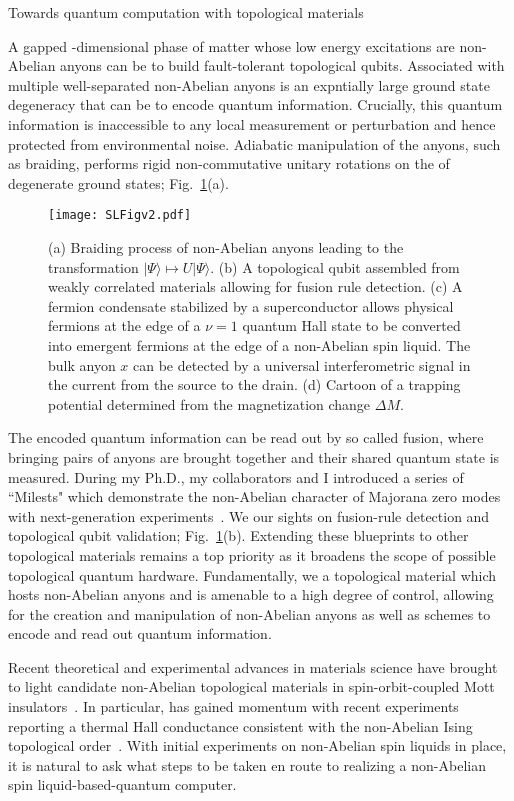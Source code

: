 {Towards quantum computation with topological materials}

A gapped -dimensional phase of matter whose low energy excitations are non-Abelian anyons can be  to build fault-tolerant topological qubits. Associated with multiple well-separated non-Abelian anyons is an expntially large ground state degeneracy that can be  to encode quantum information. Crucially, this quantum information is inaccessible to any local measurement or perturbation and hence protected from environmental noise. Adiabatic manipulation of the anyons, such as braiding, performs rigid non-commutative unitary rotations on the  of degenerate ground states;  Fig.~\ref{SLfig}(a).
\begin{figure}[htbp]
   \centering
   \texttt{[image: SLFigv2.pdf]}
   \caption{(a) Braiding process of  non-Abelian anyons leading to the transformation $|\Psi \rangle \mapsto U | \Psi \rangle$. 
{   (b) A topological qubit assembled from weakly correlated materials allowing for fusion rule detection.}
   (c) A fermion condensate stabilized by a superconductor allows physical fermions at the edge of a $\nu=1$ quantum Hall state to be converted into emergent fermions at the edge of a non-Abelian spin liquid.
{   The bulk anyon $x$ can be detected by a universal interferometric signal in the current from the source to the drain.}
   (d) Cartoon of a trapping potential determined from the magnetization change $\Delta M$.
   }
   \label{SLfig}
\end{figure}
The encoded quantum information can be read out by so called fusion, where bringing pairs of anyons are brought together and their shared quantum state is measured. 
During my Ph.D., my collaborators and I introduced a series of ``Milests" which demonstrate the non-Abelian character of Majorana zero modes with next-generation experiments~\cite{Aasen2016}. We  our sights on fusion-rule detection and topological qubit validation;  Fig.~\ref{SLfig}(b).
Extending these blueprints to other topological materials remains a top priority as it broadens the scope of possible topological quantum hardware. Fundamentally, we  a topological material which hosts non-Abelian anyons and is amenable to a high degree of control, allowing for the creation and manipulation of non-Abelian anyons as well as schemes to encode and read out quantum information.

Recent theoretical and experimental advances in materials science have brought to light  candidate non-Abelian topological materials in spin-orbit-coupled Mott insulators~\cite{Jackeli2009}.
In particular,  has gained momentum with recent experiments reporting a thermal Hall conductance consistent with the non-Abelian Ising topological order~\cite{Kasahara2017}.
With initial experiments on non-Abelian spin liquids in place, 
it is natural to ask what steps  to be taken en route to realizing a non-Abelian spin liquid-based-quantum computer.


